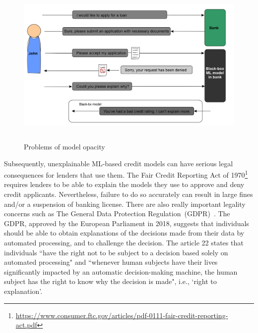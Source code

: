 \begin{figure}[h]
	\centering
	\includegraphics[width=0.9\linewidth,height=80mm]{images/loan.png}
	\caption{Problems of model opacity}
    \label{fig:model_bbm}
    \vspace{-2mm}
\end{figure}

\hspace*{3.5mm} Subsequently, unexplainable ML-based credit models can have serious legal consequences for lenders that use them. The Fair Credit Reporting Act of 1970\footnote{\url{https://www.consumer.ftc.gov/articles/pdf-0111-fair-credit-reporting-act.pdf}} requires lenders to be able to explain the models they use to approve and deny credit applicants. Nevertheless, failure to do so accurately can result in large fines and/or a suspension of banking license. %
There are also really important legality concerns such as The General Data Protection Regulation~(GDPR)~\cite{kaminski2019right}. The GDPR, approved by the European Parliament in 2018, suggests that individuals should be able to obtain explanations of the decisions made from their data by automated processing, and to challenge the decision. The article 22 states that individuals ``have the right not to be subject to a decision based solely on automated processing" and ``whenever human subjects have their lives significantly impacted by an automatic decision-making machine, the human subject has the right to know why the decision is made", i.e., `right to explanation'. 

